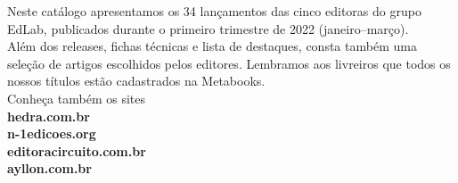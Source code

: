 \hspace*{-.5cm}\parbox{180pt}{\raggedright 
Neste catálogo apresentamos os 34 lançamentos das cinco editoras do grupo EdLab, publicados durante o primeiro trimestre de 2022 (janeiro--março).\\
\smallskip
Além dos releases, fichas técnicas e lista de destaques, consta também uma seleção de artigos escolhidos pelos editores. Lembramos aos livreiros que todos os nossos títulos estão cadastrados na Metabooks.\\
\bigskip
Conheça também os sites\\
\textbf{hedra.com.br}\\
\textbf{n-1edicoes.org}\\
\textbf{editoracircuito.com.br}\\
\textbf{ayllon.com.br}
}

\pagebreak



